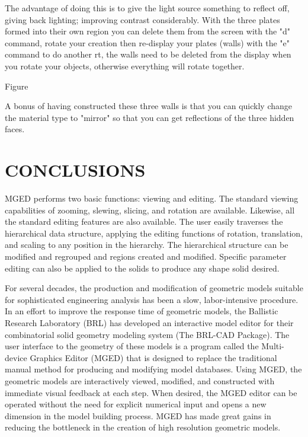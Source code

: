 The advantage of doing this is to give the light source something
to reflect off, giving back lighting; improving contrast considerably.
With the
three plates formed into their own region you can delete them from the screen
with the "d" command, rotate your creation then re-display your plates (walls)
with the "e" command to do another rt, the walls need to be deleted from the
display when you rotate your objects,
otherwise everything will rotate together.

                                   Figure

A bonus of having constructed these three walls is that you can quickly
change the material type to "mirror" so that you can get reflections of the
three hidden faces.

\chapter{CONCLUSIONS}

MGED performs two basic functions:  
viewing and editing.
The standard viewing capabilities of zooming, slewing, 
slicing, and rotation are available.
Likewise, all the standard editing features are also available.
The user easily traverses the hierarchical data structure, applying
the editing functions of rotation, translation, and scaling to any
position in the hierarchy.
The hierarchical structure can be modified and regrouped and regions
created and modified.
Specific parameter editing can also be applied to the solids to produce
any shape solid desired.

For several decades, the production and modification of geometric models
suitable for sophisticated engineering analysis
has been a slow, labor-intensive procedure.
In an effort to improve the response time of geometric models,
the Ballistic
Research Laboratory (BRL) has developed an interactive model editor
for their combinatorial solid geometry modeling system (The BRL-CAD Package).
The user interface to the geometry of these models
is a program called the Multi-device Graphics Editor (MGED)
that is designed to replace the
traditional manual method
for producing and modifying model databases.
Using MGED, the geometric models
are interactively viewed, modified, and constructed with immediate visual
feedback at each step.
When desired, the MGED editor can be operated without the need for
explicit numerical input
and opens a new dimension in the model building process.
MGED has made great gains in reducing the bottleneck in
the creation of high resolution geometric models.
